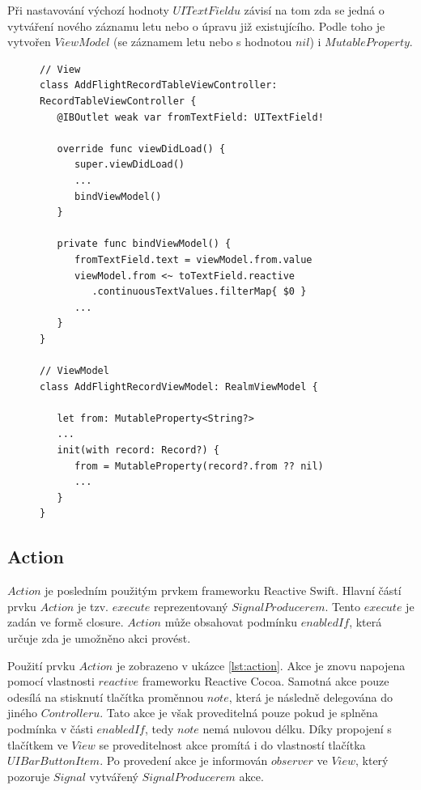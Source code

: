 \documentclass[thesis=M,czech]{FITthesis}[2012/06/26]
\begin{document}
Při nastavování výchozí hodnoty $UITextFieldu$ závisí na tom zda se jedná o vytváření nového záznamu letu nebo o úpravu již existujícího. Podle toho je vytvořen $ViewModel$ (se záznamem letu nebo s hodnotou $nil$) i $MutableProperty$.

\begin{figure}
\begin{minipage}{\linewidth}
\begin{lstlisting}[caption={Ukázka propojení $View$ a $ViewModel$},label={lst:property}]
// View
class AddFlightRecordTableViewController: 
RecordTableViewController {
   @IBOutlet weak var fromTextField: UITextField!

   override func viewDidLoad() {
      super.viewDidLoad()
      ...
      bindViewModel()
   }

   private func bindViewModel() {
      fromTextField.text = viewModel.from.value
      viewModel.from <~ toTextField.reactive
         .continuousTextValues.filterMap{ $0 }
      ...
   }
}

// ViewModel
class AddFlightRecordViewModel: RealmViewModel {

   let from: MutableProperty<String?>
   ...
   init(with record: Record?) {
      from = MutableProperty(record?.from ?? nil)
      ...
   }
}
\end{lstlisting}
\end{minipage}
\end{figure}	

\subsection{Action}
$Action$ je posledním použitým prvkem frameworku Reactive Swift. Hlavní částí prvku $Action$ je tzv. $execute$ reprezentovaný $SignalProducerem$. Tento $execute$ je zadán ve formě closure. $Action$ může obsahovat podmínku $enabledIf$, která určuje zda je umožněno akci provést.

Použití prvku $Action$ je zobrazeno v ukázce \ref{lst:action}. Akce je znovu napojena pomocí vlastnosti $reactive$ frameworku Reactive Cocoa. Samotná akce pouze odesílá na stisknutí tlačítka proměnnou $note$, která je následně delegována do jiného $Controlleru$. Tato akce je však proveditelná pouze pokud je splněna podmínka v části $enabledIf$, tedy $note$ nemá nulovou délku. Díky propojení s tlačítkem ve $View$ se proveditelnost akce promítá i do vlastností tlačítka $UIBarButtonItem$. Po provedení akce je informován $observer$ ve $View$, který pozoruje $Signal$ vytvářený $SignalProducerem$ akce.
\end{document}
